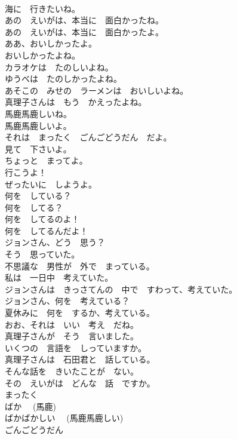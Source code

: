\documentclass[8pt]{extreport}
\begin{document}
\begin{CJK}{UTF8}{min}
\\	海に　行きたいね。	
\\	あの　えいがは、本当に　面白かったね。	
\\	あの　えいがは、本当に　面白かったよ。	
\\	ああ、おいしかったよ。	
\\	おいしかったよね。	
\\	カラオケは　たのしいよね。	
\\	ゆうべは　たのしかったよね。	
\\	あそこの　みせの　ラーメンは　おいしいよね。	
\\	真理子さんは　もう　かえったよね。	
\\	馬鹿馬鹿しいね。	
\\	馬鹿馬鹿しいよ。	
\\	それは　まったく　ごんごどうだん　だよ。	
\\	見て　下さいよ。	
\\	ちょっと　まってよ。	
\\	行こうよ！	
\\	ぜったいに　しようよ。	
\\	何を　している？	
\\	何を　してる？	
\\	何を　してるのよ！	
\\	何を　してるんだよ！	
\\	ジョンさん、どう　思う？	
\\	そう　思っていた。	
\\	不思議な　男性が　外で　まっている。	
\\	私は　一日中　考えていた。	
\\	ジョンさんは　きっさてんの　中で　すわって、考えていた。	
\\	ジョンさん、何を　考えている？	
\\	夏休みに　何を　するか、考えている。	
\\	おお、それは　いい　考え　だね。	
\\	真理子さんが　そう　言いました。	
\\	いくつの　言語を　しっていますか。	
\\	真理子さんは　石田君と　話している。	
\\	そんな話を　きいたことが　ない。	
\\	その　えいがは　どんな　話　ですか。	
\\	まったく	
\\	ばか　 (馬鹿)	
\\	ばかばかしい　 (馬鹿馬鹿しい)	
\\	ごんごどうだん	

\end{CJK}
\end{document}
